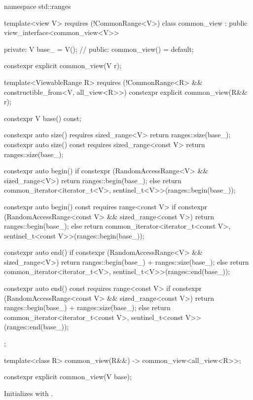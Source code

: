\begin{codeblock}
namespace std::ranges {
  template<view V>
    requires (!CommonRange<V>)
  class common_view : public view_interface<common_view<V>> {
  private:
    V base_ = V();  // \expos
  public:
    common_view() = default;

    constexpr explicit common_view(V r);

    template<ViewableRange R>
      requires (!CommonRange<R> && constructible_from<V, all_view<R>>)
    constexpr explicit common_view(R&& r);

    constexpr V base() const;

    constexpr auto size() requires sized_range<V> {
      return ranges::size(base_);
    }
    constexpr auto size() const requires sized_range<const V> {
      return ranges::size(base_);
    }

    constexpr auto begin() {
      if constexpr (RandomAccessRange<V> && sized_range<V>)
        return ranges::begin(base_);
      else
        return common_iterator<iterator_t<V>, sentinel_t<V>>(ranges::begin(base_));
    }

    constexpr auto begin() const requires range<const V> {
      if constexpr (RandomAccessRange<const V> && sized_range<const V>)
        return ranges::begin(base_);
      else
        return common_iterator<iterator_t<const V>, sentinel_t<const V>>(ranges::begin(base_));
    }

    constexpr auto end() {
      if constexpr (RandomAccessRange<V> && sized_range<V>)
        return ranges::begin(base_) + ranges::size(base_);
      else
        return common_iterator<iterator_t<V>, sentinel_t<V>>(ranges::end(base_));
    }

    constexpr auto end() const requires range<const V> {
      if constexpr (RandomAccessRange<const V> && sized_range<const V>)
        return ranges::begin(base_) + ranges::size(base_);
      else
        return common_iterator<iterator_t<const V>, sentinel_t<const V>>(ranges::end(base_));
    }
  };

  template<class R>
    common_view(R&&) -> common_view<all_view<R>>;
}
\end{codeblock}

%
\begin{itemdecl}
constexpr explicit common_view(V base);
\end{itemdecl}

\begin{itemdescr}
\pnum
\effects Initializes  with .
\end{itemdescr}

